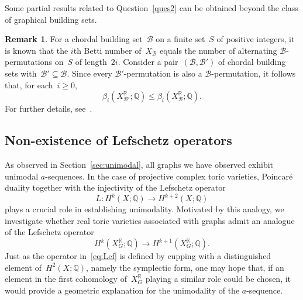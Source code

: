 \documentclass[10pt]{amsart}
\theoremstyle{plain}
\numberwithin{equation}{section}
\theoremstyle{definition}
\newtheorem{remark}[theorem]{Remark}
\newcommand{\B}{\mathcal{B}}
\newcommand{\Q}{\mathbb{Q}}
\newcommand{\R}{\mathbb{R}}
\begin{document}
Some partial results related to Question~\ref{ques2} can be obtained beyond the class of graphical building sets.

\begin{remark}
     For a chordal building set~$\B$ on a finite set~$S$ of positive integers, it is known that the $i$th Betti number of~$X_\B$ equals the number of alternating $\B$-permutations on~$S$ of length~$2i$.
    Consider a pair~$(\B,\B')$ of chordal building sets with~$\B' \subseteq \B$.
    Since every $\B'$-permutation is also a $\B$-permutation, it follows that, for each~$i \geq 0$,
    $$
    \beta_i(X^\R_{\B'};\Q) \leq \beta_i(X^\R_{\B};\Q).
    $$
    For further details, see~\cite{Choi-Yoon2026}.
\end{remark}

\subsection{Non-existence of Lefschetz operators}\label{subsec:Lefschetz}
As observed in Section~\ref{sec:unimodal}, all graphs we have observed exhibit unimodal $a$-sequences.
In the case of projective complex toric varieties, Poincar\'e duality together with the injectivity of the Lefschetz operator
\begin{equation}\label{eq:Lef}
  L \colon H^k(X;\Q) \longrightarrow H^{k+2}(X;\Q)
\end{equation}
plays a crucial role in establishing unimodality.
Motivated by this analogy, we investigate whether real toric varieties associated with graphs admit an analogue of the Lefschetz operator
$$
H^k(X^\R_G;\Q) \longrightarrow H^{k+1}(X^\R_G;\Q).
$$
Just as the operator in~\eqref{eq:Lef} is defined by cupping with a distinguished element of~$H^2(X;\Q)$, namely the symplectic form, one may hope that, if an element in the first cohomology of~$X^\R_G$ playing a similar role could be chosen, it would provide a geometric explanation for the unimodality of the $a$-sequence.
\end{document}
